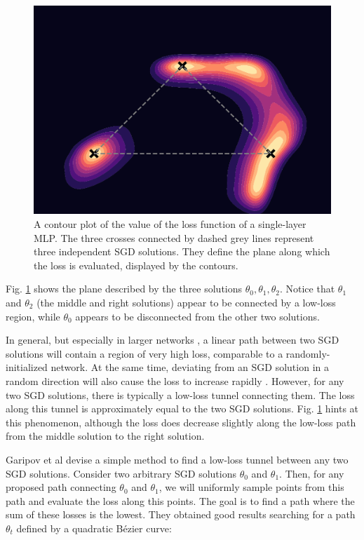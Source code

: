 \documentclass[12pt]{article}
\begin{document}
\begin{figure}[ht]
\centering
\includegraphics[width=14cm]{plots/loss_landscape.pdf}
\caption{A contour plot of the value of the loss function of a single-layer MLP. The three crosses connected by dashed grey lines represent three independent SGD solutions. They define the plane along which the loss is evaluated, displayed by the contours.}
\label{fig_loss_landscape}
\end{figure}

Fig. \ref{fig_loss_landscape} shows the plane described by the three solutions $\theta_0, \theta_1, \theta_2$. Notice that $\theta_1$ and $\theta_2$ (the middle and right solutions) appear to be connected by a low-loss region, while $\theta_0$ appears to be disconnected from the other two solutions.

In general, but especially in larger networks \cite{mode_connectivity}, a linear path between two SGD solutions will contain a region of very high loss, comparable to a randomly-initialized network. At the same time, deviating from an SGD solution in a random direction will also cause the loss to increase rapidly \cite{swag}. However, for any two SGD solutions, there is typically a low-loss tunnel connecting them. The loss along this tunnel is approximately equal to the two SGD solutions. \cite{mode_connectivity} Fig. \ref{fig_loss_landscape} hints at this phenomenon, although the loss does decrease slightly along the low-loss path from the middle solution to the right solution.

Garipov et al \cite{mode_connectivity} devise a simple method to find a low-loss tunnel between any two SGD solutions. Consider two arbitrary SGD solutions $\theta_0$ and $\theta_1$. Then, for any proposed path connecting $\theta_0$ and $\theta_1$, we will uniformly sample points from this path and evaluate the loss along this points. The goal is to find a path where the sum of these losses is the lowest. They obtained good results searching for a path $\theta_t$ defined by a quadratic Bézier curve:
\end{document}
